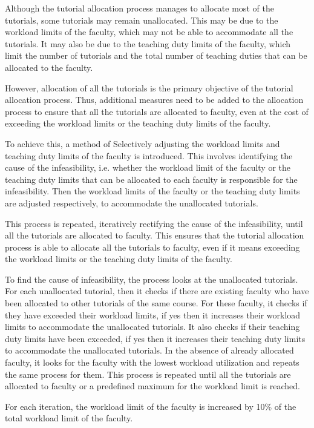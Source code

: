 Although the tutorial allocation process manages to allocate most of the tutorials, some tutorials may remain unallocated. This may be due to the workload limits of the faculty, which may not be able to accommodate all the tutorials. It may also be due to the teaching duty limits of the faculty, which limit the number of tutorials and the total number of teaching duties that can be allocated to the faculty.

However, allocation of all the tutorials is the primary objective of the tutorial allocation process. Thus, additional measures need to be added to the allocation process to ensure that all the tutorials are allocated to faculty, even at the cost of exceeding the workload limits or the teaching duty limits of the faculty.

To achieve this, a method of Selectively adjusting the workload limits and teaching duty limits of the faculty is introduced. This involves identifying the cause of the infeasibility, i.e. whether the workload limit of the faculty or the teaching duty limits that can be allocated to each faculty is responsible for the infeasibility. Then the workload limits of the faculty or the teaching duty limits are adjusted respectively, to accommodate the unallocated tutorials.

This process is repeated, iteratively rectifying the cause of the infeasibility, until all the tutorials are allocated to faculty. This ensures that the tutorial allocation process is able to allocate all the tutorials to faculty, even if it means exceeding the workload limits or the teaching duty limits of the faculty.

To find the cause of infeasibility, the process looks at the unallocated tutorials. For each unallocated tutorial, then it checks if there are existing faculty who have been allocated to other tutorials of the same course. For these faculty, it checks if they have exceeded their workload limits, if yes then it increases their workload limits to accommodate the unallocated tutorials. It also checks if their teaching duty limits have been exceeded, if yes then it increases their teaching duty limits to accommodate the unallocated tutorials. In the absence of already allocated faculty, it looks for the faculty with the lowest workload utilization and repeats the same process for them. This process is repeated until all the tutorials are allocated to faculty or a predefined maximum for the workload limit is reached.

For each iteration, the workload limit of the faculty is increased by 10\% of the total workload limit of the faculty.

